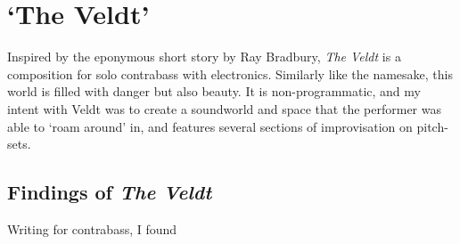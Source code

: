 \section{`The Veldt'}
Inspired by the eponymous short story by Ray Bradbury, \textit{The Veldt} is a composition for solo contrabass with electronics. 
Similarly like the namesake, this world is filled with danger but also beauty. 
It is non-programmatic, and my intent with Veldt was to create a soundworld and space that the performer was able to `roam around' in, and features several sections of improvisation on pitch-sets.

\subsection{Findings of \emph{The Veldt}}
Writing for contrabass, I found 
